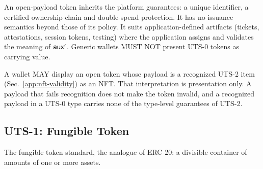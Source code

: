 An open-payload token inherits the platform guarantees: a unique identifier, a certified ownership chain and double-spend protection. It has no issuance semantics beyond those of its policy. It suits application-defined artifacts (tickets, attestations, session tokens, testing) where the application assigns and validates the meaning of $\mathsf{aux}'$. Generic wallets MUST NOT present UTS-0 tokens as carrying value.

A wallet MAY display an open token whose payload is a recognized UTS-2 item (Sec.~\ref{app:nft-validity}) as an NFT. That interpretation is presentation only. A payload that fails recognition does not make the token invalid, and a recognized payload in a UTS-0 type carries none of the type-level guarantees of UTS-2.

\subsection{UTS-1: Fungible Token}\label{app:uts-fungible}

The fungible token standard, the analogue of ERC-20: a divisible container of amounts of one or more assets.

